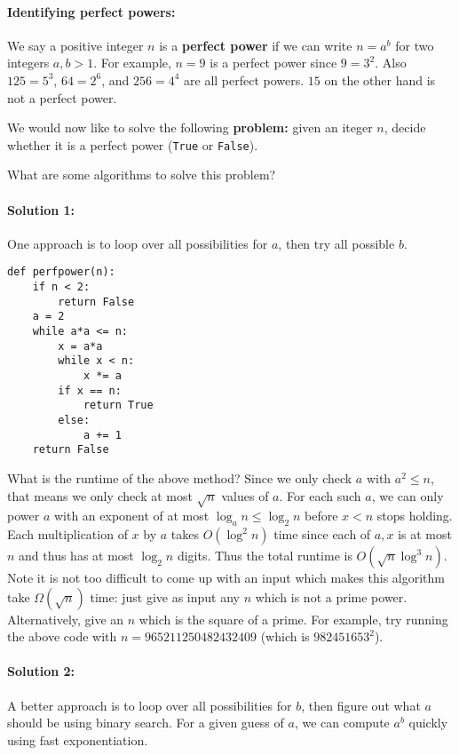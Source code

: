 \documentclass[11pt]{article}
\begin{document}
\paragraph{\Large Identifying perfect powers:} We say a positive integer $n$ is a \textbf{perfect power} if we can write $n = a^b$ for two integers $a, b > 1$. For example, $n=9$ is a perfect power since $9 = 3^2$. Also $125 = 5^3$, $64 = 2^6$, and $256 = 4^4$ are all perfect powers. $15$ on the other hand is not a perfect power.

We would now like to solve the following \textbf{problem:} given an iteger $n$, decide whether it is a perfect power (\texttt{True} or \texttt{False}).

What are some algorithms to solve this problem?

\paragraph{Solution 1:} One approach is to loop over all possibilities for $a$, then try all possible $b$.

\begin{verbatim}
def perfpower(n):
    if n < 2:
        return False
    a = 2
    while a*a <= n:
        x = a*a
        while x < n:
            x *= a
        if x == n:
            return True
        else:
            a += 1
    return False
\end{verbatim}

What is the runtime of the above method? Since we only check $a$ with $a^2 \le n$, that means we only check at most $\sqrt{n}$ values of $a$. For each such $a$, we can only power $a$ with an exponent of at most $\log_a n \le \log_2 n$ before $x < n$ stops holding. Each multiplication of $x$ by $a$ takes $O(\log^2 n)$ time since each of $a, x$ is at most $n$ and thus has at most $\log_2 n$ digits. Thus the total runtime is $O(\sqrt{n}\log^3 n)$.  Note it is not too difficult to come up with an input which makes this algorithm take $\Omega(\sqrt{n})$ time: just give as input any $n$ which is not a prime power. Alternatively, give an $n$ which is the square of a prime. For example, try running the above code with $n = 965211250482432409$ (which is $982451653^2$).

\paragraph{Solution 2:} A better approach is to loop over all possibilities for $b$, then figure out what $a$ should be using binary search. For a given guess of $a$, we can compute $a^b$ quickly using fast exponentiation.
\end{document}
